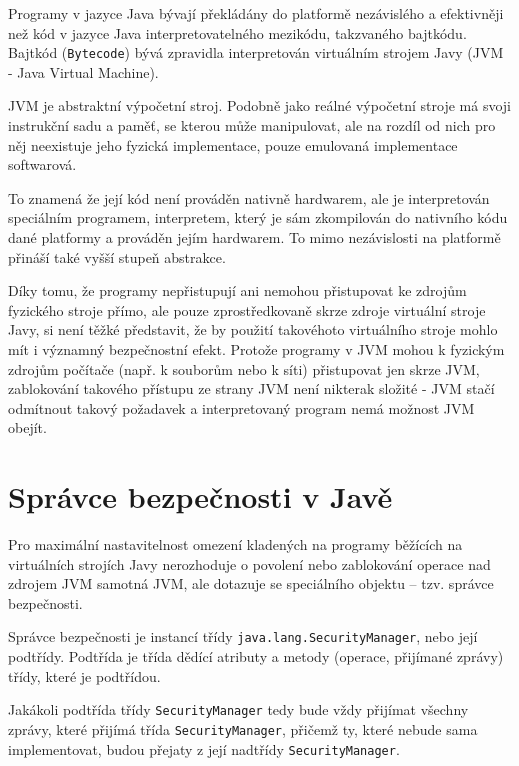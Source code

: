 Programy v jazyce Java bývají překládány do platformě nezávislého a efektivněji než kód v jazyce Java interpretovatelného mezikódu, takzvaného bajtkódu.
Bajtkód ({\tt Bytecode}) bývá zpravidla interpretován virtuálním strojem Javy (JVM - Java Virtual Machine).

JVM je abstraktní výpočetní stroj. Podobně jako reálné výpočetní stroje má svoji instrukční sadu a paměť, se kterou může manipulovat, ale na rozdíl od nich pro něj neexistuje jeho fyzická implementace, pouze emulovaná implementace softwarová.

To znamená že její kód není prováděn nativně hardwarem, ale je interpretován speciálním programem, interpretem, který je sám zkompilován do nativního kódu dané platformy a prováděn jejím hardwarem.
To mimo nezávislosti na platformě přináší také vyšší stupeň abstrakce.

Díky tomu, že programy nepřistupují ani nemohou přistupovat ke zdrojům fyzického stroje přímo, ale pouze zprostředkovaně skrze zdroje virtuální stroje Javy, si není těžké představit, že by použití takovéhoto virtuálního stroje mohlo mít i významný bezpečnostní efekt.
Protože programy v JVM mohou k fyzickým zdrojům počítače (např. k souborům nebo k síti) přistupovat jen skrze JVM, zablokování takového přístupu ze strany JVM není nikterak složité - JVM stačí odmítnout takový požadavek a interpretovaný program nemá možnost JVM obejít.

\section{Správce bezpečnosti v Javě} \label{securityManager}

Pro maximální nastavitelnost omezení kladených na programy běžících na virtuálních strojích Javy nerozhoduje o povolení nebo zablokování operace nad zdrojem JVM samotná JVM, ale dotazuje se speciálního objektu -- tzv. správce bezpečnosti.

Správce bezpečnosti je instancí třídy {\tt java.lang.SecurityManager}, nebo její podtřídy. Podtřída je třída dědící atributy a metody (operace, přijímané zprávy) třídy, které je podtřídou.

Jakákoli podtřída třídy {\tt SecurityManager} tedy bude vždy přijímat všechny zprávy, které přijímá třída {\tt SecurityManager}, přičemž ty, které nebude sama implementovat, budou přejaty z její nadtřídy {\tt SecurityManager}.

